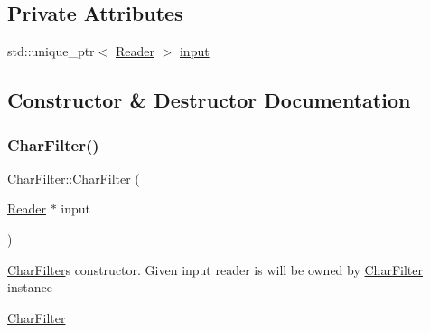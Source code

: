\subsection*{Private Attributes}
\begin{DoxyCompactItemize}
\item 
std\+::unique\+\_\+ptr$<$ \mbox{\hyperlink{classlucene_1_1core_1_1analysis_1_1Reader}{Reader}} $>$ \mbox{\hyperlink{classlucene_1_1core_1_1analysis_1_1characterutil_1_1CharFilter_a774b34856b115721d2ec012e475413c4}{input}}
\end{DoxyCompactItemize}


\subsection{Constructor \& Destructor Documentation}
\mbox{\label{classlucene_1_1core_1_1analysis_1_1characterutil_1_1CharFilter_ac13b7526b15e97a551071c2b759d1af1}} 
\subsubsection{\texorpdfstring{Char\+Filter()}{CharFilter()}}
{\footnotesize\ttfamily Char\+Filter\+::\+Char\+Filter (\begin{DoxyParamCaption}\item[{\mbox{\hyperlink{classlucene_1_1core_1_1analysis_1_1Reader}{Reader}} $\ast$}]{input }\end{DoxyParamCaption})\hspace{0.3cm}{\ttfamily [explicit]}}

\mbox{\hyperlink{classlucene_1_1core_1_1analysis_1_1characterutil_1_1CharFilter}{Char\+Filter}}\textquotesingle{}s constructor. Given input reader is will be owned by \mbox{\hyperlink{classlucene_1_1core_1_1analysis_1_1characterutil_1_1CharFilter}{Char\+Filter}} instance

\mbox{\hyperlink{classlucene_1_1core_1_1analysis_1_1characterutil_1_1CharFilter}{Char\+Filter}} \mbox{\label{classlucene_1_1core_1_1analysis_1_1characterutil_1_1CharFilter_acf60f32d245a97caebc76508363d61b6}} 
